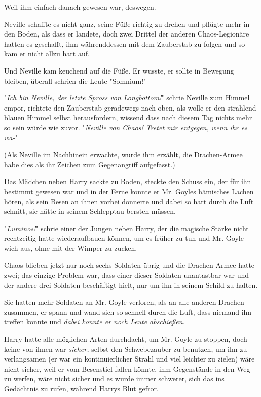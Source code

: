 {Weil ihm einfach danach gewesen war, deswegen.

Neville schaffte es nicht ganz, seine Füße richtig zu drehen und pflügte mehr in den Boden, als dass er landete, doch zwei Drittel der anderen Chaos-Legionäre hatten es geschafft, ihm währenddessen mit dem Zauberstab zu folgen und so kam er nicht allzu hart auf.

Und Neville kam keuchend auf die Füße. Er wusste, er sollte in Bewegung bleiben, überall schrien die Leute "Somnium!" -

"\emph{Ich bin Neville, der letzte Spross von Longbottom!}" schrie Neville zum Himmel empor, richtete den Zauberstab geradewegs nach oben, als wolle er den strahlend blauen Himmel selbst herausfordern, wissend dass nach diesem Tag nichts mehr so sein würde wie zuvor. "\emph{Neville von Chaos! Tretet mir entgegen, wenn ihr es wa-}"

(Als Neville im Nachhinein erwachte, wurde ihm erzählt, die Drachen-Armee habe dies als ihr Zeichen zum Gegenangriff aufgefasst.)

\later

Das Mädchen neben Harry sackte zu Boden, steckte den Schuss ein, der für ihn bestimmt gewesen war und in der Ferne konnte er Mr. Goyles hämisches Lachen hören, als sein Besen an ihnen vorbei donnerte und dabei so hart durch die Luft schnitt, sie hätte in seinem Schlepptau bersten müssen.

"\emph{Luminos!}" schrie einer der Jungen neben Harry, der die magische Stärke nicht rechtzeitig hatte wiederaufbauen können, um es früher zu tun und Mr. Goyle wich aus, ohne mit der Wimper zu zucken.

Chaos blieben jetzt nur noch sechs Soldaten übrig und die Drachen-Armee hatte zwei; das einzige Problem war, dass einer dieser Soldaten unantastbar war und der andere drei Soldaten beschäftigt hielt, nur um ihn in seinem Schild zu halten.

Sie hatten mehr Soldaten an Mr. Goyle verloren, als an alle anderen Drachen zusammen, er spann und wand sich so schnell durch die Luft, dass niemand ihn treffen konnte und \emph{dabei konnte er noch Leute abschießen.}

Harry hatte alle möglichen Arten durchdacht, um Mr. Goyle zu stoppen, doch keine von ihnen war \emph{sicher,} selbst den Schwebezauber zu benutzen, um ihn zu verlangsamen (er war ein kontinuierlicher Strahl und viel leichter zu zielen) wäre nicht sicher, weil er vom Besenstiel fallen könnte, ihm Gegenstände in den Weg zu werfen, wäre nicht sicher und es wurde immer schwerer, sich das ins Gedächtnis zu rufen, während Harrys Blut gefror.

}
